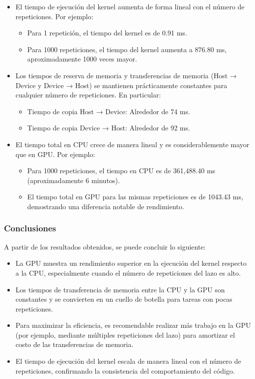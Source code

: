 \documentclass[twocolumn,a4paper,12pt]{article}
\begin{document}
\begin{itemize}
    \item El tiempo de ejecución del kernel aumenta de forma lineal con el número de repeticiones. Por ejemplo:
    \begin{itemize}
        \item Para 1 repetición, el tiempo del kernel es de 0.91 ms.
        \item Para 1000 repeticiones, el tiempo del kernel aumenta a 876.80 ms, aproximadamente 1000 veces mayor.
    \end{itemize}

    \item Los tiempos de reserva de memoria y transferencias de memoria (Host → Device y Device → Host) se mantienen prácticamente constantes para cualquier número de repeticiones. En particular:
    \begin{itemize}
        \item Tiempo de copia Host → Device: Alrededor de 74 ms.
        \item Tiempo de copia Device → Host: Alrededor de 92 ms.
    \end{itemize}

    \item El tiempo total en CPU crece de manera lineal y es considerablemente mayor que en GPU. Por ejemplo:
    \begin{itemize}
        \item Para 1000 repeticiones, el tiempo en CPU es de 361,488.40 ms (aproximadamente 6 minutos).
        \item El tiempo total en GPU para las mismas repeticiones es de 1043.43 ms, demostrando una diferencia notable de rendimiento.
    \end{itemize}

\end{itemize}

\subsubsection{Conclusiones}

A partir de los resultados obtenidos, se puede concluir lo siguiente:

\begin{itemize}
    \item La GPU muestra un rendimiento superior en la ejecución del kernel respecto a la CPU, especialmente cuando el número de repeticiones del lazo es alto.
    \item Los tiempos de transferencia de memoria entre la CPU y la GPU son constantes y se convierten en un cuello de botella para tareas con pocas repeticiones.
    \item Para maximizar la eficiencia, es recomendable realizar más trabajo en la GPU (por ejemplo, mediante múltiples repeticiones del lazo) para amortizar el costo de las transferencias de memoria.
    \item El tiempo de ejecución del kernel escala de manera lineal con el número de repeticiones, confirmando la consistencia del comportamiento del código.
\end{itemize}
\end{document}

